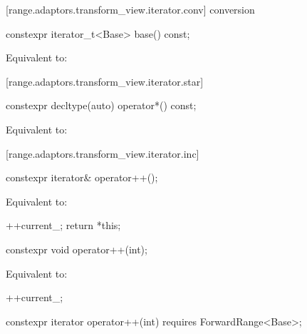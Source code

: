 \begin{addedblock}
[range.adaptors.transform_view.iterator.conv]{ conversion}

\begin{itemdecl}
constexpr iterator_t<Base> base() const;
\end{itemdecl}

\begin{itemdescr}
\pnum
\effects Equivalent to: 
\end{itemdescr}

[range.adaptors.transform_view.iterator.star]{}

\begin{itemdecl}
constexpr decltype(auto) operator*() const;
\end{itemdecl}

\begin{itemdescr}
\pnum
\effects Equivalent to: 
\end{itemdescr}

[range.adaptors.transform_view.iterator.inc]{}

\begin{itemdecl}
constexpr iterator& operator++();
\end{itemdecl}

\begin{itemdescr}
\pnum
\effects Equivalent to:
\begin{codeblock}
++current_;
return *this;
\end{codeblock}
\end{itemdescr}

\begin{itemdecl}
constexpr void operator++(int);
\end{itemdecl}

\begin{itemdescr}
\pnum
\effects Equivalent to:
\begin{codeblock}
++current_;
\end{codeblock}
\end{itemdescr}

\begin{itemdecl}
constexpr iterator operator++(int) requires ForwardRange<Base>;
\end{itemdecl}


\end{addedblock}

